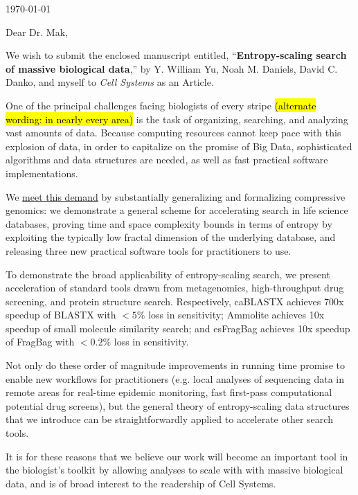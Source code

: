 \documentclass{article}
\begin{document}
\hspace*{0.5\linewidth}

\today

\bigskip

Dear Dr. Mak,

We wish to submit the enclosed manuscript entitled,
``\textbf{Entropy-scaling search of massive biological data},''
by Y. William Yu, Noah M. Daniels, David C. Danko, and myself
to \textit{Cell Systems} as an Article.

One of the principal challenges facing biologists of every stripe \hl{(alternate wording: in nearly every area)} is the task of organizing, searching, and analyzing vast amounts of data.
Because computing resources cannot keep pace with this explosion of data, in order to capitalize on the promise of Big Data, sophisticated algorithms and data structures are needed, as well as fast practical software implementations.

We \underline{meet this demand} by substantially generalizing and formalizing compressive genomics: we demonstrate a general scheme for accelerating search in life science databases, proving time and space complexity bounds in terms of entropy by exploiting the typically low fractal dimension of the underlying database, and releasing three new practical software tools for practitioners to use.
 
To demonstrate the broad applicability of entropy-scaling search, we present acceleration of standard tools drawn from metagenomics, high-throughput drug screening, and protein structure search.
Respectively, caBLASTX achieves 700x speedup of BLASTX with $<5\%$ loss in sensitivity; Ammolite achieves 10x speedup of small molecule similarity search; and esFragBag achieves 10x speedup of FragBag with $<0.2\%$ loss in sensitivity.

Not only do these order of magnitude improvements in running time promise to enable new workflows for practitioners (e.g. local analyses of sequencing data in remote areas for real-time epidemic monitoring, fast first-pass computational potential drug screens), but the general theory of entropy-scaling data structures that we introduce can be straightforwardly applied to accelerate other search tools.

It is for these reasons that we believe our work will become an important tool in the biologist's toolkit by allowing analyses to scale with with massive biological data, and is of broad interest to the readership of Cell Systems.
\end{document}

